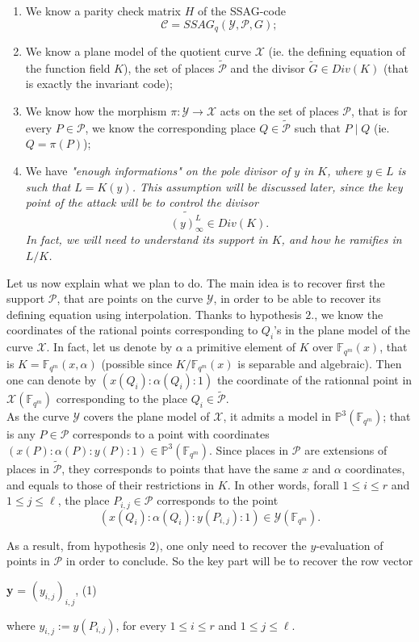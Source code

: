 \documentclass[10pt]{article}
\newcommand{\s}{\vspace{0.3cm}}
\newcommand{\fqm}{\mathbb{F}_{q^m}}
\newcommand{\X}{\mathcal{X}}
\newcommand{\Y}{\mathcal{Y}}
\newcommand{\PR}{\mathcal{P}}
\begin{document}
\begin{enumerate}
\item We know a parity check matrix $H$ of the SSAG-code  \[\mathcal{C} = SSAG_q(\Y,\PR,G) ;\]
\item We know a plane model of the quotient curve $\X$ (ie. the defining equation of the function field $K$), the set of places $\tilde{\PR}$ and the divisor $\tilde{G} \in Div(K)$ (that is exactly the invariant code);
\item We know how the morphism $\pi : \Y \rightarrow \X$ acts on the set of places $\PR$, that is for every $P \in \PR$, we know the corresponding place $Q \in \tilde{\PR}$ such that $P \mid Q$ (ie. $Q=\pi(P)$);
\item We have \it{"enough informations"} \rm on the pole divisor of $y$ in $K$, where $y \in L$ is such that $L=K(y)$. This assumption will be discussed later, since the key point of the attack will be to control the divisor 
\[\widetilde{(y)^L_{\infty}} \in Div(K).\] 
In fact, we will need to understand its support in $K$, and how he ramifies in $L/K$.
\end{enumerate}
\s

Let us now explain what we plan to do. The main idea is to recover first the support $\PR$, that are points on the curve $\Y$, in order to be able to recover its defining equation using interpolation. Thanks to hypothesis $2.$, we know the coordinates of the rational points corresponding to $Q_i$'s in the plane model of the curve $\X$. In fact, let us denote by $\alpha$ a primitive element of $K$ over $\fqm(x)$, that is $K = \fqm(x,\alpha)$ (possible since $K/\fqm(x)$ is separable and algebraic). Then one can denote by $(x(Q_i):\alpha(Q_i):1)$ the coordinate of the rationnal point in $\X(\fqm)$ corresponding to the place $Q_i \in \tilde{\PR}$. \\

As the curve $\Y$ covers the plane model of $\X$, it admits a model in $\mathbb{P}^3(\fqm)$; that is any $P \in \PR$ corresponds to a point with coordinates $(x(P):\alpha(P):y(P):1) \in \mathbb{P}^3(\fqm)$. Since places in $\PR$ are extensions of places in $\tilde{\PR}$, they corresponds to points that have the same $x$ and $\alpha$ coordinates, and equals to those of their restrictions in $K$. In other words, forall $1 \leq i \leq r$ and $1 \leq j \leq \ell$, the place $P_{i,j} \in \PR$ corresponds to the point
\[ (x(Q_i):\alpha(Q_i):y(P_{i,j}):1) \in \Y(\fqm).\]

As a result, from hypothesis $2)$, one only need to recover the $y$-evaluation of points in $\PR$ in order to conclude. So the key part will be to recover the row vector
\begin{center}
\textbf{y} = $(y_{i,j})_{i,j}$, \quad \quad \quad (1)
\end{center}
where $y_{i,j} := y(P_{i,j})$, for every $1 \leq i \leq r$ and $1 \leq j \leq \ell$.
\end{document}
